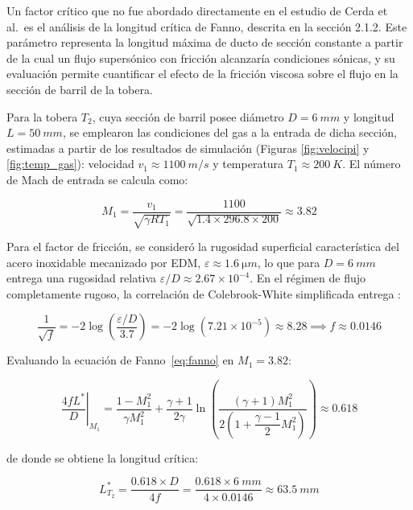 Un factor crítico que no fue abordado directamente en el estudio de Cerda et al.\ es el análisis 
de la longitud crítica de Fanno, descrita en la sección 2.1.2. Este parámetro 
representa la longitud máxima de ducto de sección constante a partir de la cual un flujo 
supersónico con fricción alcanzaría condiciones sónicas, y su evaluación permite 
cuantificar el efecto de la fricción viscosa sobre el flujo en la sección de barril de 
la tobera.

Para la tobera $T_{2}$, cuya sección de barril posee diámetro $D = \SI{6}{mm}$ y longitud 
$L = \SI{50}{mm}$, se emplearon las condiciones del gas a la entrada de dicha sección, 
estimadas a partir de los resultados de simulación (Figuras \ref{fig:velocipi} y \ref{fig:temp_gas}): velocidad $v_1 \approx \SI{1100}{m/s}$ 
y temperatura $T_1 \approx \SI{200}{K}$. El número de Mach de entrada se calcula como:

\begin{equation}
	M_1 = \frac{v_1}{\sqrt{\gamma R T_1}} = \frac{1100}{\sqrt{1.4 \times 296.8 \times 200}} 
	\approx 3.82
	\label{eq:mach_barril_T2}
\end{equation}

Para el factor de fricción, se consideró la rugosidad superficial característica del 
acero inoxidable mecanizado por EDM, $\varepsilon \approx \SI{1.6}{\micro m}$, lo que 
para $D = \SI{6}{mm}$ entrega una rugosidad relativa $\varepsilon/D \approx 2.67\times10^{-4}$. 
En el régimen de flujo completamente rugoso, la correlación de Colebrook-White simplificada 
entrega \cite{White2016}:

\begin{equation}
	\frac{1}{\sqrt{f}} = -2\log\left(\frac{\varepsilon/D}{3.7}\right) 
	= -2\log(7.21\times10^{-5}) \approx 8.28 
	\implies f \approx 0.0146
	\label{eq:factor_friccion}
\end{equation}

Evaluando la ecuación de Fanno~\eqref{eq:fanno} en $M_1 = 3.82$:

\begin{equation}
	\left.\frac{4fL^{*}}{D}\right|_{M_1} = \frac{1-M_1^2}{\gamma M_1^2} + 
	\frac{\gamma+1}{2\gamma}\ln\left(\frac{(\gamma+1)M_1^2}{2\left(1+
		\dfrac{\gamma-1}{2}M_1^2\right)}\right) \approx 0.618
	\label{eq:fanno_eval}
\end{equation}

de donde se obtiene la longitud crítica:

\begin{equation}
	L^{*}_{T_{2}} = \frac{0.618 \times D}{4f} = 
	\frac{0.618 \times \SI{6}{mm}}{4 \times 0.0146} \approx \SI{63.5}{mm}
	\label{eq:fanno_T2}
\end{equation}

